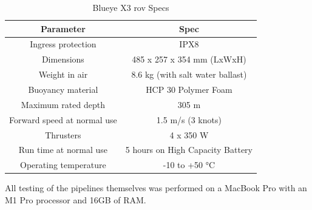 \begin{table}[H]
    \centering
    \begin{tabular}{|c|c|}
        \hline
        \textbf{Parameter} & \textbf{Spec} \\ \hline
        Ingress protection & IPX8 \\ \hline
        Dimensions & 485 x 257 x 354 mm (LxWxH) \\ \hline
        Weight in air & 8.6 kg (with salt water ballast) \\ \hline
        Buoyancy material & HCP 30 Polymer Foam \\ \hline
        Maximum rated depth & 305 m \\ \hline
        Forward speed at normal use & 1.5 m/s (3 knots) \\ \hline
        Thrusters & 4 x 350 W \\ \hline
        Run time at normal use & 5 hours on High Capacity Battery \\ \hline
        Operating temperature & -10 to +50 °C \\ \hline
    \end{tabular}
    \caption{Blueye X3 \acrshort{rov} Specs}
    \label{tab:drone_specs}
\end{table}

All testing of the pipelines themselves was performed on a MacBook Pro with an M1 Pro processor and 16GB of RAM.

